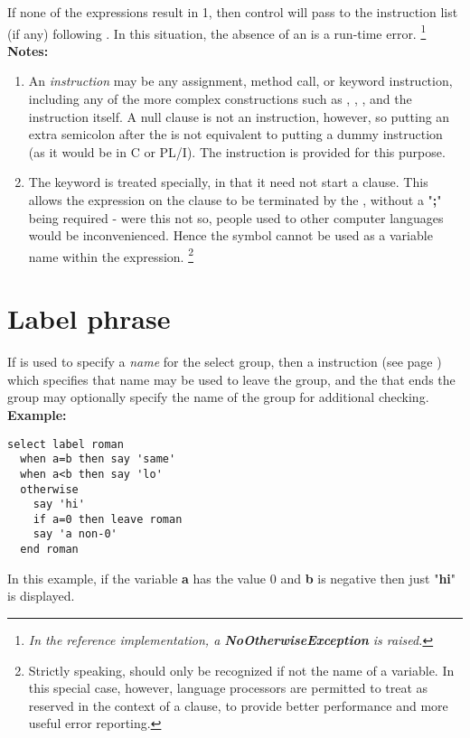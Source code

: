 If none of the  expressions result in 1, then control will
pass to the instruction list (if any) following .
In this situation, the absence of an  is a run-time
error.
\footnote{
\emph{In the reference implementation, a \textbf{NoOtherwiseException}
is raised.}
}
 \textbf{Notes:}
\begin{enumerate}
\item An \emph{instruction} may be any assignment, method call, or keyword
instruction, including any of the more complex constructions such as
, , , and the 
instruction itself.
A null clause is not an instruction, however, so putting an extra
semicolon after the  is not equivalent to putting a dummy
instruction (as it would be in C or PL/I).
The  instruction is provided for this purpose.
\item The keyword  is treated specially, in that it need not
start a clause.
This allows the expression on the  clause to be terminated
by the , without a "\textbf{;}" being required
- were this not so, people used to other computer languages would
be inconvenienced.
Hence the symbol  cannot be used as a variable name within
the expression.
\footnote{
Strictly speaking,  should only be recognized if not
the name of a variable.  In this special case, however, \nr{} language
processors are permitted to treat  as reserved in the
context of a  clause, to provide better performance and
more useful error reporting.
}
\end{enumerate}
\section{Label phrase}
 
If  is used to specify a \emph{name} for the select
group, then a   instruction (see page \pageref{refleave})  which
specifies that name may be used to leave the group, and the 
that ends the group may optionally specify the name of the group for
additional checking.
 \textbf{Example:}
\begin{lstlisting}
select label roman
  when a=b then say 'same'
  when a<b then say 'lo'
  otherwise
    say 'hi'
    if a=0 then leave roman
    say 'a non-0'
  end roman
\end{lstlisting}
In this example, if the variable \textbf{a} has the value 0
and \textbf{b} is negative then just "\textbf{hi}" is
displayed.
